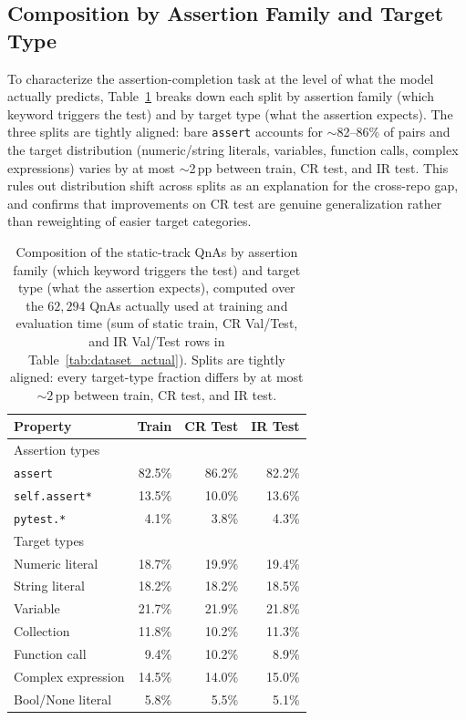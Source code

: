 \documentclass[11pt]{article}
\begin{document}
\subsection{Composition by Assertion Family and Target Type}
\label{app:dataset_composition}

To characterize the assertion-completion task at the level of what the model actually predicts, Table~\ref{tab:dataset_details} breaks down each split by assertion family (which keyword triggers the test) and by target type (what the assertion expects).
The three splits are tightly aligned: bare \texttt{assert} accounts for ${\sim}$82--86\% of pairs and the target distribution (numeric/string literals, variables, function calls, complex expressions) varies by at most ${\sim}$2\,pp between train, CR test, and IR test.
This rules out distribution shift across splits as an explanation for the cross-repo gap, and confirms that improvements on CR test are genuine generalization rather than reweighting of easier target categories.

\begin{table}[t]
\begin{small}
\begin{center}
\caption{Composition of the static-track QnAs by assertion family (which keyword triggers the test) and target type (what the assertion expects), computed over the $62{,}294$ QnAs actually used at training and evaluation time (sum of static train, CR Val/Test, and IR Val/Test rows in Table~\ref{tab:dataset_actual}). Splits are tightly aligned: every target-type fraction differs by at most ${\sim}2$\,pp between train, CR test, and IR test.}\label{tab:dataset_details}

\begin{tabular}{lrrr}
\toprule
Property & Train & CR Test & IR Test \\
\midrule
Assertion types & & & \\
\quad \texttt{assert} & 82.5\% & 86.2\% & 82.2\% \\
\quad \texttt{self.assert*} & 13.5\% & 10.0\% & 13.6\% \\
\quad \texttt{pytest.*} & 4.1\% & 3.8\% & 4.3\% \\
\midrule
Target types & & & \\
\quad Numeric literal & 18.7\% & 19.9\% & 19.4\% \\
\quad String literal & 18.2\% & 18.2\% & 18.5\% \\
\quad Variable & 21.7\% & 21.9\% & 21.8\% \\
\quad Collection & 11.8\% & 10.2\% & 11.3\% \\
\quad Function call & 9.4\% & 10.2\% & 8.9\% \\
\quad Complex expression & 14.5\% & 14.0\% & 15.0\% \\
\quad Bool/None literal & 5.8\% & 5.5\% & 5.1\% \\
\bottomrule
\end{tabular}


\end{center}
\end{small}
\end{table}
\end{document}
